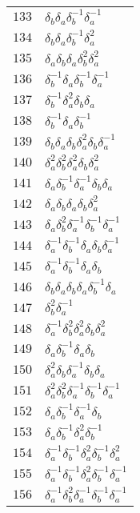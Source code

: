 \documentclass{article}
\begin{document}
\begin{center}
\begin{tabular}{ll}
$133$ & $\delta_b^{}\delta_a^{}\delta_b^{-1}\delta_a^{-1}$ \\
$134$ & $\delta_b^{}\delta_a^{}\delta_b^{-1}\delta_a^{2}$ \\
$135$ & $\delta_a^{}\delta_b^{}\delta_a^{}\delta_b^{2}\delta_a^{2}$ \\
$136$ & $\delta_b^{-1}\delta_a^{}\delta_b^{-1}\delta_a^{-1}$ \\
$137$ & $\delta_b^{-1}\delta_a^{2}\delta_b^{}\delta_a^{}$ \\
$138$ & $\delta_b^{-1}\delta_a^{}\delta_b^{-1}$ \\
$139$ & $\delta_b^{}\delta_a^{}\delta_b^{}\delta_a^{2}\delta_b^{}\delta_a^{-1}$ \\
$140$ & $\delta_a^{2}\delta_b^{2}\delta_a^{2}\delta_b^{}\delta_a^{2}$ \\
$141$ & $\delta_a^{}\delta_b^{-1}\delta_a^{-1}\delta_b^{}\delta_a^{}$ \\
$142$ & $\delta_a^{}\delta_b^{}\delta_a^{}\delta_b^{}\delta_a^{2}$ \\
$143$ & $\delta_a^{}\delta_b^{2}\delta_a^{-1}\delta_b^{-1}\delta_a^{-1}$ \\
$144$ & $\delta_a^{-1}\delta_b^{-1}\delta_a^{}\delta_b^{}\delta_a^{-1}$ \\
$145$ & $\delta_a^{-1}\delta_b^{-1}\delta_a^{}\delta_b^{}$ \\
$146$ & $\delta_b^{}\delta_a^{}\delta_b^{}\delta_a^{}\delta_b^{-1}\delta_a^{}$ \\
$147$ & $\delta_b^{2}\delta_a^{-1}$ \\
$148$ & $\delta_a^{-1}\delta_b^{2}\delta_a^{2}\delta_b^{}\delta_a^{2}$ \\
$149$ & $\delta_a^{}\delta_b^{-1}\delta_a^{}\delta_b^{}$ \\
$150$ & $\delta_a^{2}\delta_b^{}\delta_a^{-1}\delta_b^{}\delta_a^{}$ \\
$151$ & $\delta_a^{2}\delta_b^{2}\delta_a^{-1}\delta_b^{-1}\delta_a^{-1}$ \\
$152$ & $\delta_a^{}\delta_b^{-1}\delta_a^{-1}\delta_b^{}$ \\
$153$ & $\delta_a^{}\delta_b^{-1}\delta_a^{2}\delta_b^{-1}$ \\
$154$ & $\delta_a^{-1}\delta_b^{-1}\delta_a^{2}\delta_b^{-1}\delta_a^{2}$ \\
$155$ & $\delta_a^{-1}\delta_b^{-1}\delta_a^{2}\delta_b^{-1}\delta_a^{-1}$ \\
$156$ & $\delta_a^{-1}\delta_b^{2}\delta_a^{-1}\delta_b^{-1}\delta_a^{-1}$ \\

\end{tabular}
\end{center}
\end{document}
